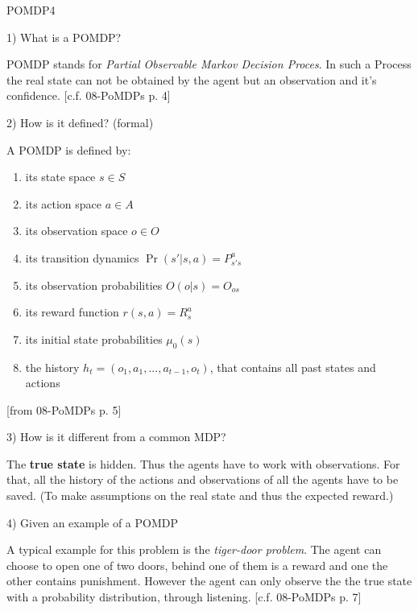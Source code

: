 \newif\ifvimbug
\vimbugfalse

\ifvimbug

	\fi
{}

\begin{questions}
\begin{question}{POMDP}{4}
	
		1) What is a POMDP? 
\begin{answer}
	
	POMDP stands for \textit{Partial Observable Markov Decision Proces}. In such a Process the real state can not be obtained by the agent but an observation and it's confidence. [c.f. 08-PoMDPs p. 4]
\end{answer}

	2) How is it defined? (formal) 
\begin{answer}
	
	A POMDP is defined by:
	\begin{enumerate}
		\item its state space $s \in S$
		\item its action space $a \in A$
		\item its observation space $ o \in O$
		\item its transition dynamics $ \Pr(s'|s,a) = P_{s's}^a$
		\item its observation probabilities $O(o|s) = O_{os}$
		\item its reward function $r(s,a) = R_s^a$
		\item its initial state probabilities $\mu_0(s)$
		\item the history $h_t = (o_1, a_1 ,...,a_{t-1}, o_t)$, that contains all past states and actions
	\end{enumerate}
	[from 08-PoMDPs p. 5]
\end{answer}

	3) How is it different from a common MDP? 
\begin{answer}
	
	The \textbf{true state} is hidden. Thus the agents have to work with observations. For that, all the history of the actions and observations of all the agents have to be saved. (To make assumptions on the real state and thus the expected reward.)
\end{answer}

	4) 		Given an example of a POMDP
\begin{answer}
	
	A typical example for this problem is the \textit{tiger-door problem}.
	The agent can choose to open one of two doors, behind one of them is a reward and one the other contains punishment. However the agent can only observe the the true state with a probability distribution, through listening.
	[c.f. 08-PoMDPs p. 7]
\end{answer}
\end{question}




\end{questions}
